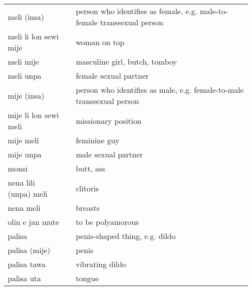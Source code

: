 \begin{supertabular}{p{4,5cm}|ll}
    meli (insa)                        &  & person who identifies as female, e.g. male-to-female transsexual person           \\
    meli li lon sewi mije              &  & woman on top                                                                      \\
    meli mije                          &  & masculine girl, butch, tomboy                                                     \\
    meli unpa                          &  & female sexual partner                                                             \\
    mije (insa)                        &  & person who identifies as male, e.g. female-to-male transsexual person             \\
    mije li lon sewi meli              &  & missionary position                                                               \\
    mije meli                          &  & feminine guy                                                                      \\
    mije unpa                          &  & male sexual partner                                                               \\
    monsi                              &  & butt, ass                                                                         \\
    nena lili (unpa) meli              &  & clitoris                                                                          \\
    nena meli                          &  & breasts                                                                           \\
    olin e jan mute                    &  & to be polyamorous                                                                 \\
    palisa                             &  & penis-shaped thing, e.g. dildo                                                    \\
    palisa (mije)                      &  & penis                                                                             \\
    palisa tawa                        &  & vibrating dildo                                                                   \\
    palisa uta                         &  & tongue                                                                            \\

\end{supertabular}
